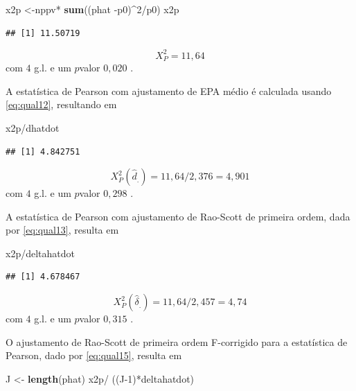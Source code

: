 \documentclass[]{book}
\newenvironment{Shaded}{\begin{snugshade}}{\end{snugshade}}
\newcommand{\KeywordTok}[1]{\textcolor[rgb]{0.13,0.29,0.53}{\textbf{{#1}}}}
\newcommand{\DecValTok}[1]{\textcolor[rgb]{0.00,0.00,0.81}{{#1}}}
\newcommand{\StringTok}[1]{\textcolor[rgb]{0.31,0.60,0.02}{{#1}}}
\newcommand{\NormalTok}[1]{{#1}}
\numberwithin{example}{chapter}
\numberwithin{remark}{chapter}
\numberwithin{definition}{chapter}
\begin{document}
\begin{Shaded}
\begin{Highlighting}[]
\NormalTok{x2p <-nppv*}\StringTok{ }\KeywordTok{sum}\NormalTok{((phat -p0)^}\DecValTok{2}\NormalTok{/p0)}
\NormalTok{x2p}
\end{Highlighting}
\end{Shaded}

\begin{verbatim}
## [1] 11.50719
\end{verbatim}

\[
X_{P}^{2}=11,64 
\] com \(4\) g.l. e um \(p\)valor \(0,020\) .

A estatística de Pearson com ajustamento de EPA médio é calculada usando
\eqref{eq:qual12}, resultando em

\begin{Shaded}
\begin{Highlighting}[]
\NormalTok{x2p/dhatdot}
\end{Highlighting}
\end{Shaded}

\begin{verbatim}
## [1] 4.842751
\end{verbatim}

\[
X_{P}^{2}\left( \hat{d}_{.}\right) =11,64/2,376=4,901 
\] com \(4\) g.l. e um \(p\)valor \(0,298\) .

A estatística de Pearson com ajustamento de Rao-Scott de primeira ordem,
dada por \eqref{eq:qual13}, resulta em

\begin{Shaded}
\begin{Highlighting}[]
\NormalTok{x2p/deltahatdot }
\end{Highlighting}
\end{Shaded}

\begin{verbatim}
## [1] 4.678467
\end{verbatim}

\[
X_{P}^{2}\left( \hat{\delta}_{.}\right) =11,64/2,457=4,74 
\] com \(4\) g.l. e um \(p\)valor \(0,315\) .

O ajustamento de Rao-Scott de primeira ordem F-corrigido para a
estatística de Pearson, dado por \eqref{eq:qual15}, resulta em

\begin{Shaded}
\begin{Highlighting}[]
\NormalTok{J <-}\StringTok{ }\KeywordTok{length}\NormalTok{(phat)}
\NormalTok{x2p/}\StringTok{ }\NormalTok{((J}\DecValTok{-1}\NormalTok{)*deltahatdot)}
\end{Highlighting}
\end{Shaded}
\end{document}
